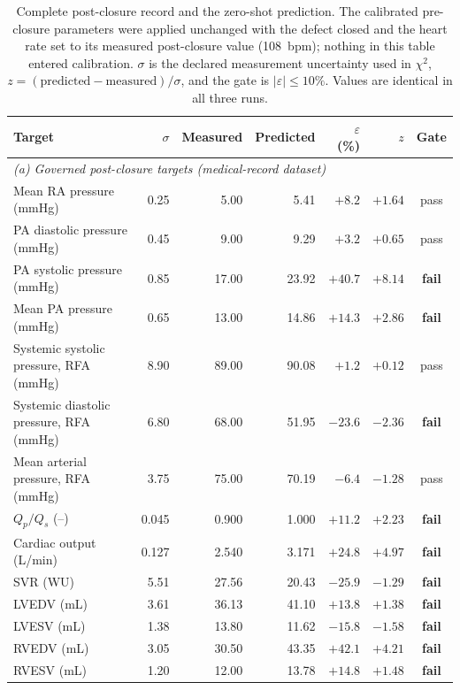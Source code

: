 \begin{table}[ht]
\centering\small
\setlength{\tabcolsep}{4pt}
\caption{Complete post-closure record and the zero-shot prediction. The calibrated pre-closure parameters were applied unchanged with the defect closed and the heart rate set to its measured post-closure value (108~bpm); nothing in this table entered calibration. $\sigma$ is the declared measurement uncertainty used in $\chi^2$, $z = (\text{predicted}-\text{measured})/\sigma$, and the gate is $\lvert\varepsilon\rvert \le 10\%$. Values are identical in all three runs.}
\label{tab:post}
\begin{tabular}{lrrrrrc}
\toprule
\textbf{Target} & $\sigma$ & \textbf{Measured} & \textbf{Predicted} & $\varepsilon$ (\%) & $z$ & \textbf{Gate} \\
\midrule
\multicolumn{7}{l}{\emph{(a) Governed post-closure targets (medical-record dataset)}} \\
Mean RA pressure (mmHg) & 0.25 & 5.00 & 5.41 & $+8.2$ & $+1.64$ & pass \\
PA diastolic pressure (mmHg) & 0.45 & 9.00 & 9.29 & $+3.2$ & $+0.65$ & pass \\
PA systolic pressure (mmHg) & 0.85 & 17.00 & 23.92 & $+40.7$ & $+8.14$ & \textbf{fail} \\
Mean PA pressure (mmHg) & 0.65 & 13.00 & 14.86 & $+14.3$ & $+2.86$ & \textbf{fail} \\
Systemic systolic pressure, RFA (mmHg) & 8.90 & 89.00 & 90.08 & $+1.2$ & $+0.12$ & pass \\
Systemic diastolic pressure, RFA (mmHg) & 6.80 & 68.00 & 51.95 & $-23.6$ & $-2.36$ & \textbf{fail} \\
Mean arterial pressure, RFA (mmHg) & 3.75 & 75.00 & 70.19 & $-6.4$ & $-1.28$ & pass \\
$Q_p/Q_s$ (--) & 0.045 & 0.900 & 1.000 & $+11.2$ & $+2.23$ & \textbf{fail} \\
Cardiac output (L/min) & 0.127 & 2.540 & 3.171 & $+24.8$ & $+4.97$ & \textbf{fail} \\
SVR (WU) & 5.51 & 27.56 & 20.43 & $-25.9$ & $-1.29$ & \textbf{fail} \\
LVEDV (mL) & 3.61 & 36.13 & 41.10 & $+13.8$ & $+1.38$ & \textbf{fail} \\
LVESV (mL) & 1.38 & 13.80 & 11.62 & $-15.8$ & $-1.58$ & \textbf{fail} \\
RVEDV (mL) & 3.05 & 30.50 & 43.35 & $+42.1$ & $+4.21$ & \textbf{fail} \\
RVESV (mL) & 1.20 & 12.00 & 13.78 & $+14.8$ & $+1.48$ & \textbf{fail} \\

\end{tabular}
\end{table}
